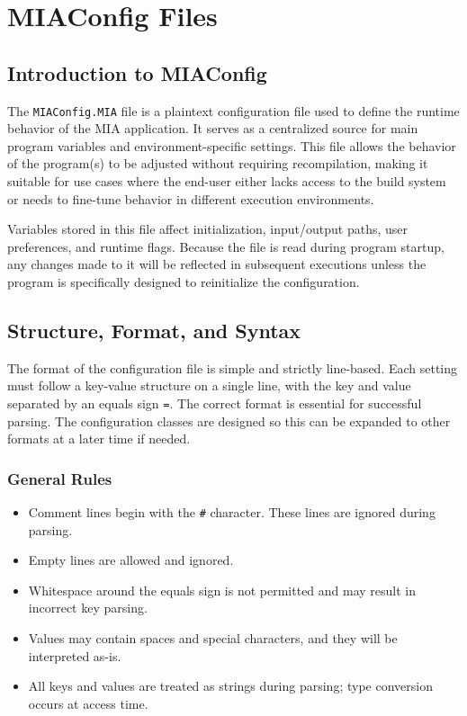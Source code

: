 \chapter{MIAConfig Files} \label{chap:MIAConfig}
\pagestyle{fancy}

\lstset{language=Python}

\section{Introduction to MIAConfig}

The \texttt{MIAConfig.MIA} file is a plaintext configuration file used to define the runtime behavior of the MIA application. It serves as a centralized source for main program variables and environment-specific settings. This file allows the behavior of the program(s) to be adjusted without requiring recompilation, making it suitable for use cases where the end-user either lacks access to the build system or needs to fine-tune behavior in different execution environments.

Variables stored in this file affect initialization, input/output paths, user preferences, and runtime flags. Because the file is read during program startup, any changes made to it will be reflected in subsequent executions unless the program is specifically designed to reinitialize the configuration.

\section{Structure, Format, and Syntax}

The format of the configuration file is simple and strictly line-based. Each setting must follow a key-value structure on a single line, with the key and value separated by an equals sign \texttt{=}. The correct format is essential for successful parsing. The configuration classes are designed so this can be expanded to other formats at a later time if needed.

\subsection*{General Rules}

\begin{itemize}\itemsep0em
	\item Comment lines begin with the \texttt{\#} character. These lines are ignored during parsing.
	\item Empty lines are allowed and ignored.
	\item Whitespace around the equals sign is not permitted and may result in incorrect key parsing.
	\item Values may contain spaces and special characters, and they will be interpreted as-is.
	\item All keys and values are treated as strings during parsing; type conversion occurs at access time.
\end{itemize}

